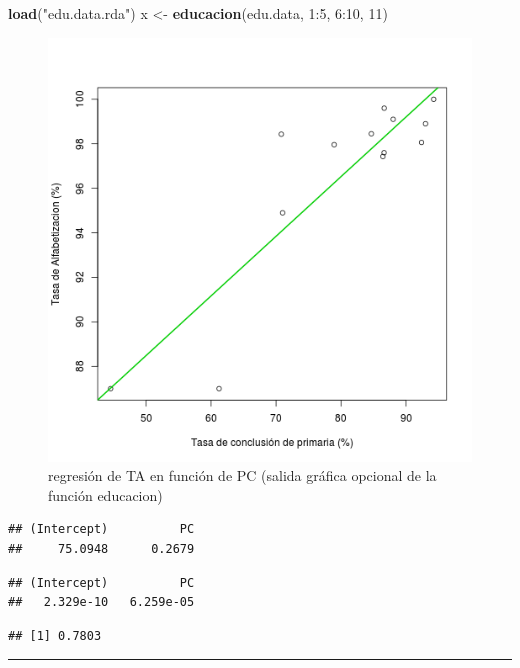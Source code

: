 \documentclass[]{article}
\makeatletter
\newenvironment{Shaded}{}{}
\newcommand{\KeywordTok}[1]{\textcolor[rgb]{0.00,0.44,0.13}{\textbf{{#1}}}}
\newcommand{\DecValTok}[1]{\textcolor[rgb]{0.25,0.63,0.44}{{#1}}}
\newcommand{\StringTok}[1]{\textcolor[rgb]{0.25,0.44,0.63}{{#1}}}
\newcommand{\NormalTok}[1]{{#1}}
\def\maxwidth{\ifdim\Gin@nat@width>\linewidth\linewidth
\else\Gin@nat@width\fi}
\let\Oldincludegraphics\includegraphics
\renewcommand{\includegraphics}[1]{\Oldincludegraphics[width=\maxwidth]{#1}}
\makeatother
\begin{document}
\begin{Shaded}
\begin{Highlighting}[]
\KeywordTok{load}\NormalTok{(}\StringTok{"edu.data.rda"}\NormalTok{)}
\NormalTok{x <- }\KeywordTok{educacion}\NormalTok{(edu.data, }\DecValTok{1}\NormalTok{:}\DecValTok{5}\NormalTok{, }\DecValTok{6}\NormalTok{:}\DecValTok{10}\NormalTok{, }\DecValTok{11}\NormalTok{)}
\end{Highlighting}
\end{Shaded}
\begin{figure}[htbp]
\centering
\includegraphics{figure/unnamed-chunk-5.png}
\caption{regresión de TA en función de PC (salida gráfica opcional de la
función educacion)}
\end{figure}

\begin{Shaded}
\end{Shaded}
\begin{verbatim}
## (Intercept)          PC 
##     75.0948      0.2679 
\end{verbatim}
\begin{Shaded}
\end{Shaded}
\begin{verbatim}
## (Intercept)          PC 
##   2.329e-10   6.259e-05 
\end{verbatim}
\begin{Shaded}
\end{Shaded}
\begin{verbatim}
## [1] 0.7803
\end{verbatim}
\begin{center}\rule{3in}{0.4pt}\end{center}
\end{document}
